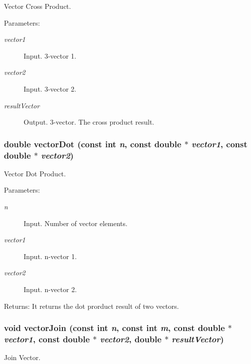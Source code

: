 Vector Cross Product. 

\begin{Desc}
\item[Parameters:]
\begin{description}
\item[{\em vector1}]Input. 3-vector 1. \item[{\em vector2}]Input. 3-vector 2. \item[{\em resultVector}]Output. 3-vector. The cross product result. \end{description}
\end{Desc}
\hypertarget{group__a_gc985f610b5e647c96a03cf89098aa271}{
\subsubsection[vectorDot]{\setlength{\rightskip}{0pt plus 5cm}double vectorDot (const int {\em n}, \/  const double $\ast$ {\em vector1}, \/  const double $\ast$ {\em vector2})}}
\label{group__a_gc985f610b5e647c96a03cf89098aa271}


Vector Dot Product. 

\begin{Desc}
\item[Parameters:]
\begin{description}
\item[{\em n}]Input. Number of vector elements. \item[{\em vector1}]Input. n-vector 1. \item[{\em vector2}]Input. n-vector 2.\end{description}
\end{Desc}
\begin{Desc}
\item[Returns:]It returns the dot prorduct result of two vectors. \end{Desc}
\hypertarget{group__a_gc00ab414706bc82820e985055f285f3b}{
\subsubsection[vectorJoin]{\setlength{\rightskip}{0pt plus 5cm}void vectorJoin (const int {\em n}, \/  const int {\em m}, \/  const double $\ast$ {\em vector1}, \/  const double $\ast$ {\em vector2}, \/  double $\ast$ {\em resultVector})}}
\label{group__a_gc00ab414706bc82820e985055f285f3b}


Join Vector. 

